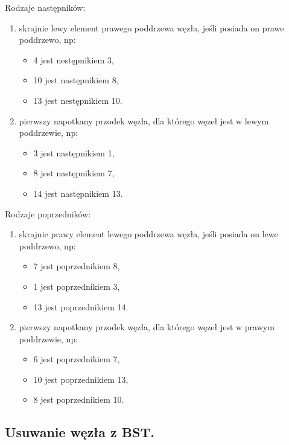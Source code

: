 \documentclass[12pt]{article}
\begin{document}
    Rodzaje następników:
    \begin{enumerate}
        \item skrajnie lewy element prawego poddrzewa węzła, jeśli posiada on prawe poddrzewo, np:
        \begin{itemize}
            \item 4 jest nestępnikiem 3,
            \item 10 jest następnikiem 8,
            \item 13 jest nestępnikiem 10.
        \end{itemize}
        \item pierwszy napotkany przodek węzła, dla którego węzeł jest w lewym poddrzewie, np:
        \begin{itemize}
            \item 3 jest następnikiem 1,
            \item 8 jest następnikiem 7,
            \item 14 jest następnikiem 13.
        \end{itemize}
    \end{enumerate}

    Rodzaje poprzedników:
    \begin{enumerate}
        \item skrajnie prawy element lewego poddrzewa węzła, jeśli posiada on lewe poddrzewo, np:
        \begin{itemize}
            \item 7 jest poprzednikiem 8,
            \item 1 jest poprzednikiem 3,
            \item 13 jest poprzednikiem 14.
        \end{itemize}
        \item pierwszy napotkany przodek węzła, dla którego węzeł jest w prawym poddrzewie, np:
        \begin{itemize}
            \item 6 jest poprzednikiem 7,
            \item 10 jest poprzednikiem 13,
            \item 8 jest poprzednikiem 10.
        \end{itemize}
    \end{enumerate}

    \subsection{Usuwanie węzła z BST.}
\end{document}
